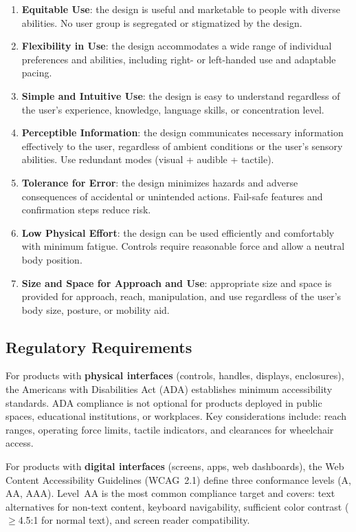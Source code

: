 \begin{enumerate}[nosep,leftmargin=1.5em]
\item \textbf{Equitable Use}: the design is useful and marketable to people with diverse abilities. No user group is segregated or stigmatized by the design.
\item \textbf{Flexibility in Use}: the design accommodates a wide range of individual preferences and abilities, including right- or left-handed use and adaptable pacing.
\item \textbf{Simple and Intuitive Use}: the design is easy to understand regardless of the user's experience, knowledge, language skills, or concentration level.
\item \textbf{Perceptible Information}: the design communicates necessary information effectively to the user, regardless of ambient conditions or the user's sensory abilities. Use redundant modes (visual + audible + tactile).
\item \textbf{Tolerance for Error}: the design minimizes hazards and adverse consequences of accidental or unintended actions. Fail-safe features and confirmation steps reduce risk.
\item \textbf{Low Physical Effort}: the design can be used efficiently and comfortably with minimum fatigue. Controls require reasonable force and allow a neutral body position.
\item \textbf{Size and Space for Approach and Use}: appropriate size and space is provided for approach, reach, manipulation, and use regardless of the user's body size, posture, or mobility aid.
\end{enumerate}

\subsection{Regulatory Requirements}
For products with \textbf{physical interfaces} (controls, handles, displays, enclosures), the Americans with Disabilities Act (ADA) establishes minimum accessibility standards. ADA compliance is not optional for products deployed in public spaces, educational institutions, or workplaces. Key considerations include: reach ranges, operating force limits, tactile indicators, and clearances for wheelchair access.

For products with \textbf{digital interfaces} (screens, apps, web dashboards), the Web Content Accessibility Guidelines (WCAG~2.1) define three conformance levels (A, AA, AAA). Level~AA is the most common compliance target and covers: text alternatives for non-text content, keyboard navigability, sufficient color contrast ($\geq$4.5:1 for normal text), and screen reader compatibility.

